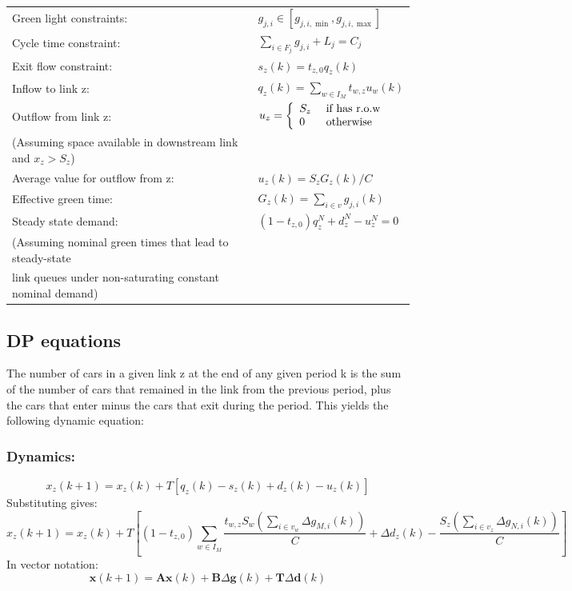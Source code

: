 \documentclass[11pt]{article}
\begin{document}
\begin{tabular}{ l l }
Green light constraints: & $g_{j,i} \in \left[g_{j, i, \min }, g_{j, i, \max }\right]$ \\
Cycle time constraint: & $\sum_{i \in F_{j}} g_{j, i}+L_{j}=C_j$ \\
Exit flow constraint: & $s_{z}(k)=t_{z, 0} q_{z}(k)$ \\
Inflow to link z: & $q_{z}(k)= \sum_{w \in I_{M}} t_{w, z} u_{w}(k)$ \\
Outflow from link z: & $u_z = \left\{ \begin{array} { l l } { S_z } & { \text { if  has r.o.w}  } \\ { 0 } & { \text { otherwise} } \end{array} \right.$ \\
(Assuming space available in downstream link and $x_z>S_z$)\\
Average value for outflow from z: & $u_{z}(k)=S_{z} G_{z}(k) / C$\\
Effective green time: & $G_{z}(k)=\sum_{i \in v} g_{j, i}(k)$ \\
Steady state demand: & $\left(1-t_{z, 0}\right) q_{z}^{N}+d_{z}^{N}-u_{z}^{N}=0$ \\
(Assuming nominal green times that lead to steady-state \\
link queues under non-saturating constant nominal demand) \\
\end{tabular}


\subsection{DP equations}
The number of cars in a given link z at the end of any given period k is the sum of the number of cars that remained in the link from the previous period, plus the cars that enter minus the cars that exit during the period. This yields the following dynamic equation:
\subsubsection*{Dynamics:}
\begin{equation}
x_{z}(k+1)=x_{z}(k)+T\left[q_{z}(k)-s_{z}(k)+d_{z}(k)-u_{z}(k)\right]
\end{equation}
Substituting gives:
\begin{equation}
x_{z}(k+1) =x_{z}(k)+T\left[\left(1-t_{z, 0}\right) \sum_{w \in I_{M}} \frac{t_{w, z} S_{w}\left(\sum_{i \in v_{w}} \Delta g_{M, i}(k)\right)}{C} +\Delta d_{z}(k)-\frac{S_{z}\left(\sum_{i \in v_{z}} \Delta g_{N, i}(k)\right)}{C} \right]
\end{equation}
In vector notation: 
\begin{equation}
\mathbf{x}(k+1)=\mathbf{A} \mathbf{x}(k)+\mathbf{B} \Delta \mathbf{g}(k)+\mathbf{T} \Delta \mathbf{d}(k)
\end{equation}
\end{document}
